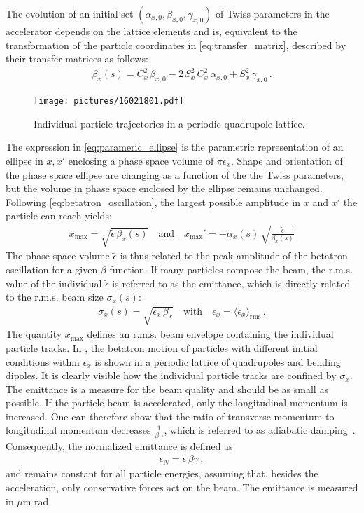 The evolution of an initial set $(\alpha_{x,0},\beta_{x,0},\gamma_{x,0})$ of Twiss parameters in the accelerator depends on the lattice elements and is, equivalent to the transformation of the particle coordinates in \eqref{eq:transfer_matrix}, described by their transfer matrices as follows:
%
\begin{align}
  \beta_x(s) = C_x^2 \, \beta_{x,0} -2 \, S_x^2 \, C_x^2 \, \alpha_{x,0} + S_x^2 \, \gamma_{x,0} \, .
\end{align}
%
\begin{figure}[b]  
    \centering
    \texttt{[image: pictures/16021801.pdf]}
    \caption{Individual particle trajectories in a periodic quadrupole lattice.}  
    \label{pic:16021801}
\end{figure}
%
The expression in \eqref{eq:parameric_ellipse} is the parametric representation of an ellipse in $x,x'$ enclosing a phase space volume of $\pi \tilde{\epsilon}_x$. Shape and orientation of the phase space ellipse are changing as a function of the the Twiss parameters, but the volume in phase space enclosed by the ellipse remains unchanged. Following \eqref{eq:betatron_oscillation}, the largest possible amplitude in $x$ and $x'$ the particle can reach yields:
%
\begin{align}
  x_\text{max} = \sqrt{\tilde{\epsilon} \, \beta_x(s)} \quad \text{and} \quad x_\text{max}' = - \alpha_x (s) \, \sqrt{\frac{\tilde{\epsilon}}{\beta_x(s)}}
\end{align}
%
The phase space volume $\tilde{\epsilon}$ is thus related to the peak amplitude of the betatron oscillation for a given $\beta$-function. If many particles compose the beam, the r.m.s. value of the individual $\tilde{\epsilon}$ is referred to as the emittance, which is directly related to the r.m.s. beam size $\sigma_x(s)$:
%
\begin{align}
  \sigma_x (s) = \sqrt{\epsilon_x \, \beta_x} \quad \text{with} \quad \epsilon_x = \langle \tilde{\epsilon_x} \rangle_{\text{rms}} \, .
\end{align}
%
The quantity $x_\text{max}$ defines an r.m.s. beam envelope containing the individual particle tracks. In , the betatron motion of particles with different initial conditions within $\epsilon_x$ is shown in a periodic lattice of quadrupoles and bending dipoles. It is clearly visible how the individual particle tracks are confined by $\sigma_x$.
%
The emittance is a measure for the beam quality and should be as small as possible. If the particle beam is accelerated, only the longitudinal momentum is increased. One can therefore show that the ratio of transverse momentum to longitudinal momentum decreases $\frac{1}{\beta \, \gamma}$, which is referred to as adiabatic damping~\cite{wiedemann1999particle}. Consequently, the normalized emittance is defined as 
%
\begin{align}
  \epsilon_N = \epsilon \, \beta \gamma \, ,
\end{align}
and remains constant for all particle energies, assuming that, besides the acceleration, only conservative forces  act on the beam. The emittance is measured in $\mu$m rad.




